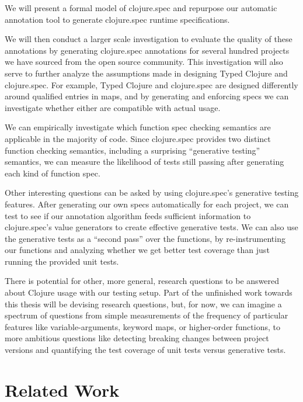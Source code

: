 \documentclass[9pt]{extarticle}
\begin{document}
We will present a formal model of clojure.spec and repurpose our automatic annotation
tool to generate clojure.spec runtime specifications.

We will then conduct a larger scale investigation to evaluate the quality 
of these annotations by generating clojure.spec annotations for several hundred
projects we have sourced from the open source community.
This investigation will also serve to further analyze the assumptions made 
in designing Typed Clojure and clojure.spec.
For example, Typed Clojure and clojure.spec are designed differently
around qualified entries in maps, and by generating and enforcing specs
we can investigate whether either are compatible with actual usage.

We can empirically investigate which function spec checking semantics are 
applicable in the majority of code. Since clojure.spec provides
two distinct function checking semantics, including a surprising
``generative testing'' semantics, we can measure the likelihood
of tests still passing after generating each kind of function spec.

Other interesting questions can be asked by using clojure.spec's generative
testing features. After generating our own specs automatically for each project,
we can test to see if our annotation algorithm feeds sufficient information
to clojure.spec's value generators to create effective generative tests.
We can also use the generative tests as a ``second pass'' over the functions,
by re-instrumenting our functions and analyzing whether we get better
test coverage than just running the provided unit tests.

There is potential for other, more general, research questions
to be answered about Clojure usage with our testing setup.
Part of the unfinished work towards this thesis will be devising research questions,
but, for now, we can imagine a spectrum of questions
from simple measurements of the frequency of particular features like variable-arguments,
keyword maps, or higher-order functions, to more ambitious questions
like detecting breaking changes between project versions
and quantifying the test coverage of unit tests versus generative tests.

\section{Related Work}

\end{document}
